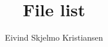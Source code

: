 \documentclass{report}
\begin{document}
\title{File list}
\author{Eivind Skjelmo Kristiansen}
\maketitle

\tableofcontents*
\cleardoublepage

\listoftables
\cleardoublepage


\end{document}
